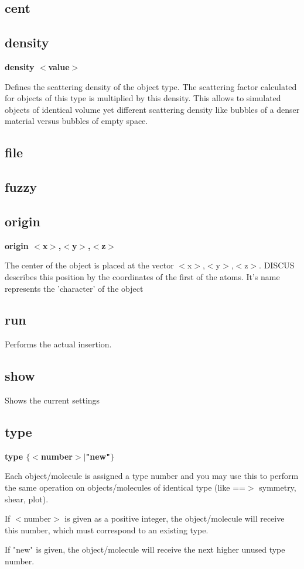 \subsection*{cent}
\subsection*{density}
{\bf density $ <$value$> $ \par }
\par
\vspace{3pt}
Defines the scattering density of the object type. The scattering 
factor calculated for objects of this type is multiplied by this 
density. This allows to simulated objects of identical volume yet 
different scattering density like bubbles of a denser material 
versus bubbles of empty space. 
\subsection*{file}
\subsection*{fuzzy}
\subsection*{origin}
{\bf origin $ <$x$> $,$ <$y$> $,$ <$z$> $ \par }
\par
\vspace{3pt}
The center of the object is placed at the vector $ <$x$> $,$ <$y$> $,$ <$z$> $. 
DISCUS describes this position by the coordinates of the first 
of the atoms. It's name represents the 'character' of the object 
\subsection*{run}
\par
Performs the actual insertion. 
\subsection*{show}
\par
Shows the current settings 
\subsection*{type}
{\bf type $ \{$$ <$number$> $$| $"new"$\} $ \par }
\par
\vspace{3pt}
Each object/molecule is assigned a type number and you may use this 
to perform the same operation on objects/molecules of identical 
type (like ==$> $ symmetry, shear, plot). 
\par
If $ <$number$> $ is given as a positive integer, the object/molecule will 
receive this number, which must correspond to an existing type. 
\par
If "new" is given, the object/molecule will receive the next higher 
unused type number. 
